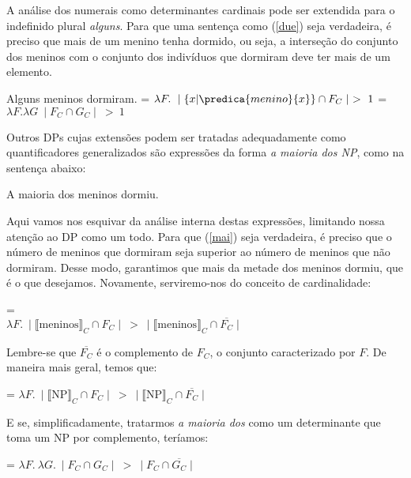 A análise dos numerais como determinantes cardinais pode ser extendida para o indefinido
plural \textit{alguns}. Para que uma sentença como (\ref{due})
seja verdadeira, é preciso que mais de um menino tenha dormido, ou
seja, a interseção do conjunto dos meninos com o conjunto dos
indivíduos que dormiram deve ter mais de um elemento.

\begin{exe}
    \ex Alguns meninos dormiram. \label{due}
	\ex {} = $\lambda F.\ \mid \{x | \predica{menino}{x}\}\cap F_{C}\mid\ >\ 1$
	\ex {} = $\lambda F.\lambda G\ \mid F_{C}\cap G_{C}\mid\ >\ 1$
\end{exe}


\n Outros DPs cujas extensões podem ser tratadas adequadamente como quantificadores generalizados são expressões da forma \textit{a maioria dos NP}, como na sentença abaixo:

\begin{exe}
    \ex A maioria dos meninos dormiu. \label{mai}
\end{exe}

\n Aqui vamos nos esquivar da análise interna destas expressões,
limitando nossa atenção ao DP como um todo. Para que (\ref{mai})
seja verdadeira, é preciso que o número de meninos que dormiram
seja superior ao número de meninos que não dormiram. Desse modo,
garantimos que mais da metade dos meninos dormiu, que é o que
desejamos. Novamente, serviremo-nos do conceito de cardinalidade:

\begin{exe}
	\ex {} = \\
	$\lambda F.\ \mid \llbracket \text{meninos} \rrbracket_{C}\cap F_{C}\mid\ >\ \mid \llbracket \text{meninos} \rrbracket_{C}\cap \overline{F_{C}}\mid $
\end{exe}

\n Lembre-se que $\overline{F_{C}}$ é o complemento de $F_{C}$, o conjunto caracterizado por $F$. De maneira mais geral, temos que:

\begin{exe}
	\ex {} = $\lambda F.\ \mid \llbracket \text{NP} \rrbracket_{C}\cap F_{C}\mid\ >\ \mid \llbracket \text{NP} \rrbracket_{C}\cap \overline{F_{C}}\mid $
\end{exe}

\n E se, simplificadamente, tratarmos \textit{a maioria dos} como um determinante que toma um NP por complemento, teríamos:

\begin{exe}
	\ex {} = $\lambda F.\ \lambda G.\ \mid F_{C}\cap G_{C}\mid\ >\ \mid F_{C}\cap \overline{G_{C}}\mid $
\end{exe}

